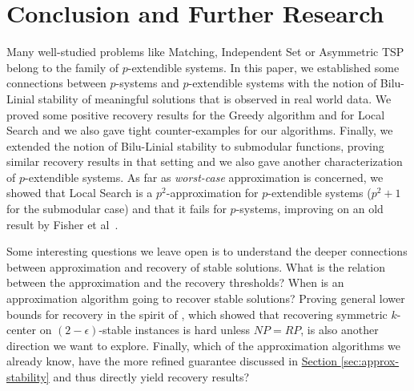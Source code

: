 \section{Conclusion and Further Research}\label{sec:conclusion}
Many well-studied problems like Matching, Independent Set or Asymmetric TSP belong to the family of $p$-extendible systems. In this paper, we established some connections between $p$-systems and $p$-extendible systems with the notion of Bilu-Linial stability of meaningful solutions that is observed in real world data. We proved some positive recovery results for the Greedy algorithm and for Local Search and we also gave tight counter-examples for our algorithms. Finally, we extended the notion of Bilu-Linial stability to submodular functions, proving similar recovery results in that setting and we also gave another characterization of $p$-extendible systems. As far as \textit{worst-case} approximation is concerned, we showed that Local Search is a $p^2$-approximation for $p$-extendible systems ($p^2+1$ for the submodular case) and that it fails for $p$-systems, improving on an old result by Fisher et al~\cite{nemhauser1978analysis, fisher1978analysis, korte1978analysis}.

Some interesting questions we leave open is to understand the deeper connections between approximation and recovery of stable solutions. What is the relation between the approximation and the recovery thresholds? When is an approximation algorithm going to recover stable solutions? Proving general lower bounds for recovery in the spirit of \cite{balcan2015k}, which showed that recovering symmetric $k$-center on $(2- \epsilon)$-stable instances is hard unless $NP = RP$, is also another direction we want to explore. Finally, which of the approximation algorithms we already know, have the more refined guarantee discussed in \hyperref[sec:approx-stability]{Section \ref{sec:approx-stability}} and thus directly yield recovery results?